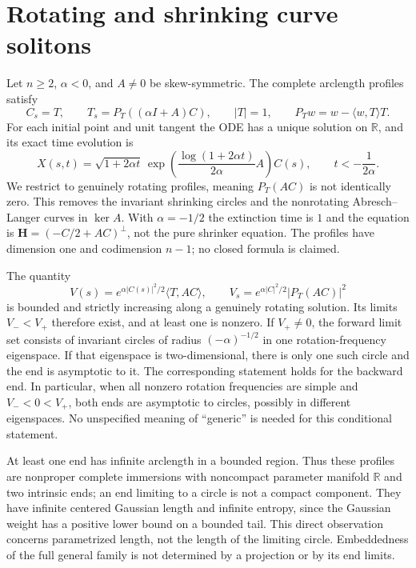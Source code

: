\chapter{Rotating and shrinking curve solitons}\label{sec:catalogue-rotating-shrinking-curves}
\begin{example}\label{ex:catalogue-rotating-shrinking-curves}
Let $n\geq2$, $\alpha<0$, and $A\ne0$ be skew-symmetric. The complete arclength profiles satisfy
\[
 C_s=T,\qquad T_s=P_T((\alpha I+A)C),\qquad |T|=1,
 \qquad P_Tw=w-\langle w,T\rangle T.
\]
For each initial point and unit tangent the ODE has a unique solution on $\mathbb R$, and its exact time evolution is
\[
 X(s,t)=\sqrt{1+2\alpha t}\,
 \exp\left(\frac{\log(1+2\alpha t)}{2\alpha}A\right)C(s),
 \qquad t<-\frac1{2\alpha}.
\]
We restrict to genuinely rotating profiles, meaning $P_T(AC)$ is not identically zero. This removes the invariant shrinking circles and the nonrotating Abresch--Langer curves in $\ker A$. With $\alpha=-1/2$ the extinction time is $1$ and the equation is $\mathbf H=(-C/2+AC)^\perp$, not the pure shrinker equation. The profiles have dimension one and codimension $n-1$; no closed formula is claimed.

The quantity
\[
 V(s)=e^{\alpha|C(s)|^2/2}\langle T,AC\rangle,
 \qquad V_s=e^{\alpha|C|^2/2}|P_T(AC)|^2
\]
is bounded and strictly increasing along a genuinely rotating solution. Its limits $V_-<V_+$ therefore exist, and at least one is nonzero. If $V_+\ne0$, the forward limit set consists of invariant circles of radius $(-\alpha)^{-1/2}$ in one rotation-frequency eigenspace. If that eigenspace is two-dimensional, there is only one such circle and the end is asymptotic to it. The corresponding statement holds for the backward end. In particular, when all nonzero rotation frequencies are simple and $V_-<0<V_+$, both ends are asymptotic to circles, possibly in different eigenspaces. No unspecified meaning of ``generic'' is needed for this conditional statement.

At least one end has infinite arclength in a bounded region. Thus these profiles are nonproper complete immersions with noncompact parameter manifold $\mathbb R$ and two intrinsic ends; an end limiting to a circle is not a compact component. They have infinite centered Gaussian length and infinite entropy, since the Gaussian weight has a positive lower bound on a bounded tail. This direct observation concerns parametrized length, not the length of the limiting circle. Embeddedness of the full general family is not determined by a projection or by its end limits.


\end{example}
